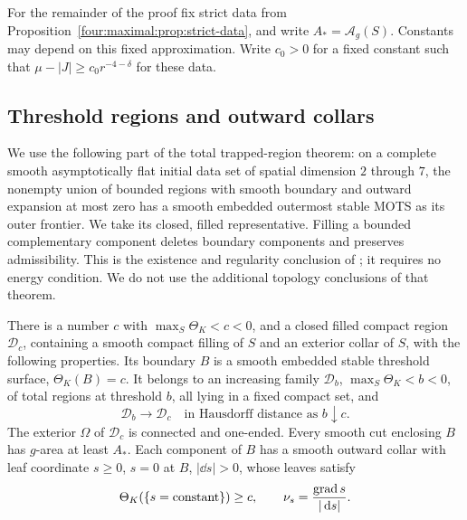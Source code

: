 For the remainder of the proof fix strict data from
Proposition~\ref{four:maximal:prop:strict-data}, and write
\(A_*=\mathcal A_g(S)\).  Constants may depend on this fixed approximation.
Write \(c_0>0\) for a fixed constant such that
\(\mu-|J|\ge c_0r^{-4-\delta}\) for these data.

\subsection{Threshold regions and outward collars}

We use the following part of the total trapped-region theorem:
on a complete smooth asymptotically flat initial data set of spatial
dimension \(2\) through \(7\), the nonempty union of bounded regions
with smooth boundary and outward expansion at most zero has a smooth
embedded outermost stable MOTS as its outer frontier.  We take its
closed, filled representative.  Filling a bounded complementary
component deletes boundary components and preserves admissibility.
This is the existence and regularity conclusion of
\cite[Section~4.3, Theorem~4.6]{AnderssonEichmairMetzger2011}; it requires no energy
condition.  We do not use the additional topology conclusions of that
theorem.

\begin{lemma}
\label{four:maximal:lem:threshold-collars}
There is a number \(c\) with \(\max_S\Theta_K<c<0\), and a
closed filled compact region \(\mathcal D_c\), containing a smooth
compact filling of \(S\) and an exterior collar of \(S\), with the
following properties.
Its boundary \(B\) is a smooth embedded stable threshold surface,
\(\Theta_K(B)=c\).  It belongs to an increasing family
\(\mathcal D_b\), \(\max_S\Theta_K<b<0\), of total regions
at threshold \(b\), all lying in a fixed compact set, and
\begin{equation}
 \mathcal D_{b}\longrightarrow\mathcal D_c
       \quad\text{in Hausdorff distance as }b\downarrow c.
\label{four:maximal:prep:right-continuity}
\end{equation}
The exterior \(\Omega\) of \(\mathcal D_c\) is connected and
one-ended.  Every smooth cut enclosing \(B\) has \(g\)-area at
least \(A_*\).  Each component of \(B\) has a smooth outward
collar with leaf coordinate \(s\ge0\), \(s=0\) at \(B\),
\(|\dd s|>0\), whose leaves satisfy
\begin{equation}
 \Theta_K(\{s=\text{constant}\})\ge c,
 \qquad \nu_s=\frac{\operatorname{grad} s}{|\,\mathrm d s|}.
\label{four:maximal:prep:outward-collars}
\end{equation}
\end{lemma}

